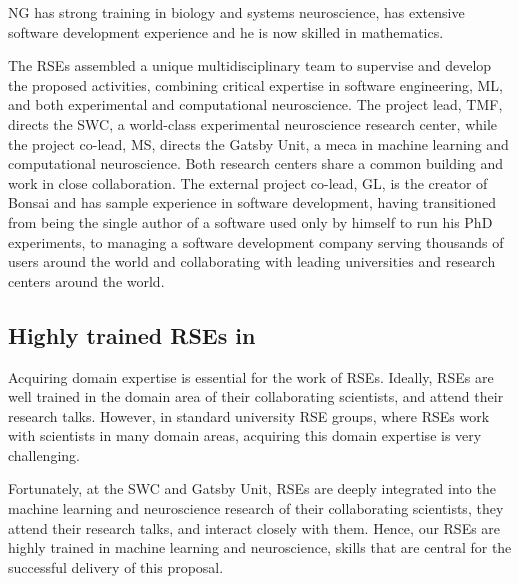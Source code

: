 NG has strong training in biology and systems neuroscience, has extensive
software development experience and he is now skilled in mathematics.

The RSEs assembled a unique multidisciplinary team to supervise and develop the
proposed activities, combining critical expertise in software engineering, ML,
and both experimental and computational neuroscience.
%
The project lead, TMF, directs the SWC, a world-class experimental neuroscience
research center, while the project co-lead, MS, directs the Gatsby Unit, a meca
in machine learning and computational neuroscience. Both research centers share
a common building and work in close collaboration.
%
The external project co-lead, GL, is the creator of Bonsai and has sample
experience in software development, having transitioned from being the single
author of a software used only by himself to run his PhD experiments, to
managing a software development company serving thousands of users around the
world and collaborating with leading universities and research centers around
the world.



\subsection*{Highly trained RSEs in }

Acquiring domain expertise is essential for the work of RSEs. Ideally, RSEs
are well trained in the domain area of their collaborating scientists, and
attend their research talks. However, in standard university RSE groups, where
RSEs work with scientists in many domain areas, acquiring this domain expertise
is very challenging.

Fortunately, at the SWC and Gatsby Unit, RSEs are deeply integrated into the
machine learning and neuroscience research of their collaborating scientists,
they attend their research talks, and interact closely with them.  Hence, our
RSEs are highly trained in machine learning and neuroscience, skills that are
central for the successful delivery of this proposal.
